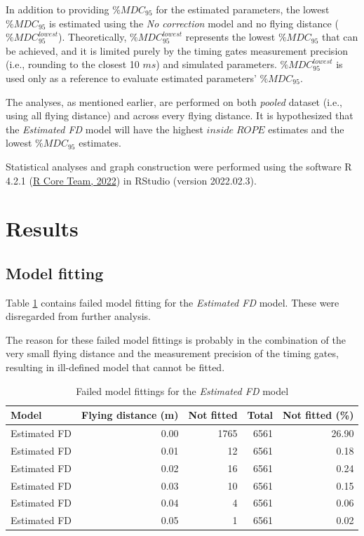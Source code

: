\documentclass[fleqn,10pt,lineno]{wlpeerj} %
\begin{document}
In addition to providing \(\%MDC_{95}\) for the estimated parameters, the lowest \(\%MDC_{95}\) is estimated using the \emph{No correction} model and no flying distance (\(\%MDC_{95}^{lowest}\)). Theoretically, \(\%MDC_{95}^{lowest}\) represents the lowest \(\%MDC_{95}\) that can be achieved, and it is limited purely by the timing gates measurement precision (i.e., rounding to the closest 10 \(ms\)) and simulated parameters. \(\%MDC_{95}^{lowest}\) is used only as a reference to evaluate estimated parameters' \(\%MDC_{95}\).

The analyses, as mentioned earlier, are performed on both \emph{pooled} dataset (i.e., using all flying distance) and across every flying distance. It is hypothesized that the \emph{Estimated FD} model will have the highest \(inside \; ROPE\) estimates and the lowest \(\%MDC_{95}\) estimates.

Statistical analyses and graph construction were performed using the software R 4.2.1 (\protect\hyperlink{ref-R-base}{R Core Team, 2022}) in RStudio (version 2022.02.3).

\hypertarget{results}{%
\section{Results}\label{results}}

\hypertarget{model-fitting}{%
\subsection{Model fitting}\label{model-fitting}}

Table \ref{tab:tbl-not-fitted} contains failed model fitting for the \emph{Estimated FD} model. These were disregarded from further analysis.

The reason for these failed model fittings is probably in the combination of the very small flying distance and the measurement precision of the timing gates, resulting in ill-defined model that cannot be fitted.



\begin{table}

\caption{\label{tab:tbl-not-fitted}Failed model fittings for the \emph{Estimated FD} model}
\centering
\begin{tabular}[t]{lrrrr}
\toprule
Model & Flying distance (m) & Not fitted & Total & Not fitted (\%)\\
\midrule
Estimated FD & 0.00 & 1765 & 6561 & 26.90\\
Estimated FD & 0.01 & 12 & 6561 & 0.18\\
Estimated FD & 0.02 & 16 & 6561 & 0.24\\
Estimated FD & 0.03 & 10 & 6561 & 0.15\\
Estimated FD & 0.04 & 4 & 6561 & 0.06\\
\addlinespace
Estimated FD & 0.05 & 1 & 6561 & 0.02\\
\bottomrule
\end{tabular}
\end{table}
\end{document}
